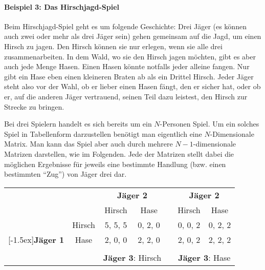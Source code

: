 \paragraph{Beispiel 3: Das Hirschjagd-Spiel}
\label{Hirschjagdspiel}

Beim Hirschjagd-Spiel geht es um folgende Geschichte: Drei Jäger (es können auch
zwei oder mehr als drei Jäger sein) gehen gemeinsam auf die Jagd, um einen Hirsch zu jagen. 
Den Hirsch können sie nur erlegen, wenn sie alle drei zusammenarbeiten. In dem
Wald, wo sie den Hirsch jagen möchten, gibt es aber auch jede Menge Hasen. Einen Hasen
könnte notfalls jeder alleine fangen. Nur gibt ein Hase eben einen kleineren
Braten ab als ein Drittel Hirsch. Jeder Jäger steht also vor der Wahl, ob er
lieber einen Hasen fängt, den er sicher hat, oder ob er, auf die anderen 
Jäger vertrauend, seinen Teil dazu
leistest, den Hirsch zur Strecke zu bringen. 

Bei drei Spielern handelt es sich bereits um ein $N$-Personen Spiel. Um ein
solches Spiel in Tabellenform darzustellen benötigt man eigentlich eine
$N$-Dimensionale Matrix. Man kann das Spiel aber auch durch mehrere
$N-1$-dimensionale Matrizen darstellen, wie im Folgenden. Jede der Matrizen
stellt dabei die möglichen Ergebnisse für jeweils eine bestimmte Handlung (bzw.
einen bestimmten "`Zug"') von Jäger drei dar.

\begin{center}
\begin{tabular}{cc|c|c| c|c|c|}

& \multicolumn{1}{c}{} & \multicolumn{2}{c}{\bf Jäger 2} 
& \multicolumn{1}{c}{} & \multicolumn{2}{c}{\bf Jäger 2} \\
& \multicolumn{1}{c}{} 
& \multicolumn{1}{c}{Hirsch} & \multicolumn{1}{c}{Hase} 
& \multicolumn{1}{c}{} 
& \multicolumn{1}{c}{Hirsch} & \multicolumn{1}{c}{Hase} 
\\ \cline{3-4} \cline{6-7}
 
& Hirsch   & 5, 5, 5 & 0, 2, 0 & &  0, 0, 2 & 0, 2, 2 \\
\cline{3-4} \cline{6-7}
\raisebox{1.5ex}[-1.5ex]{{\bf Jäger 1}} 
& Hase     & 2, 0, 0 & 2, 2, 0 & &  2, 0, 2 & 2, 2, 2 \\
\cline{3-4} \cline{6-7}
\multicolumn{7}{c}{} \\
& \multicolumn{1}{c}{} & \multicolumn{2}{c}{{\small {\bf Jäger 3}: Hirsch}}
& \multicolumn{1}{c}{} & \multicolumn{2}{c}{{\small {\bf Jäger 3}: Hase}} \\


\end{tabular}
\end{center}


